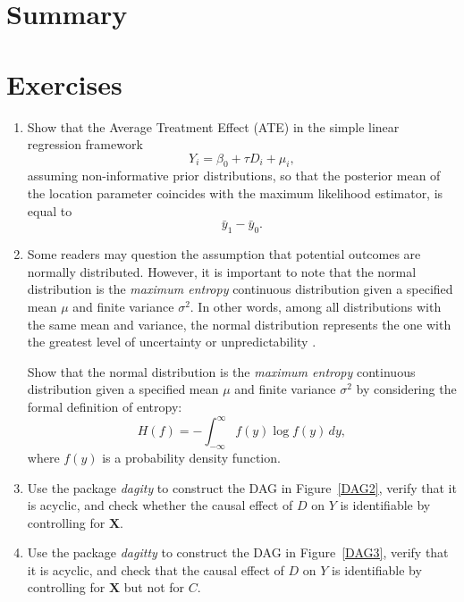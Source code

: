 
\section{Summary}

\section{Exercises}

\begin{enumerate}
	\item Show that the Average Treatment Effect (ATE) in the simple linear regression framework
	\[
	Y_i = \beta_0 + \tau D_i + \mu_i,
	\]
	assuming non-informative prior distributions, so that the posterior mean of the location parameter coincides with the maximum likelihood estimator, is equal to
	\[
	\bar{y}_1 - \bar{y}_0.
	\]
	
	\item Some readers may question the assumption that potential outcomes are normally distributed. However, it is important to note that the normal distribution is the \textit{maximum entropy} continuous distribution given a specified mean $\mu$ and finite variance $\sigma^2$. In other words, among all distributions with the same mean and variance, the normal distribution represents the one with the greatest level of uncertainty or unpredictability \cite{cover2006elements}.
	
	Show that the normal distribution is the \textit{maximum entropy} continuous distribution given a specified mean $\mu$ and finite variance $\sigma^2$ by considering the formal definition of entropy:
	\[
	H(f) = - \int_{-\infty}^{\infty} f(y) \log f(y) \, dy,
	\]
	where $f(y)$ is a probability density function.
	
	\item Use the package \textit{dagity} to construct the DAG in Figure~\ref{DAG2}, verify that it is acyclic, and check whether the causal effect of \(D\) on \(Y\) is identifiable by controlling for \(\mathbf{X}\).
	
	\item Use the package \textit{dagitty} to construct the DAG in Figure~\ref{DAG3}, verify that it is acyclic, and check that the causal effect of \(D\) on \(Y\) is identifiable by controlling for \(\mathbf{X}\) but not for \(C\).
	

\end{enumerate}
